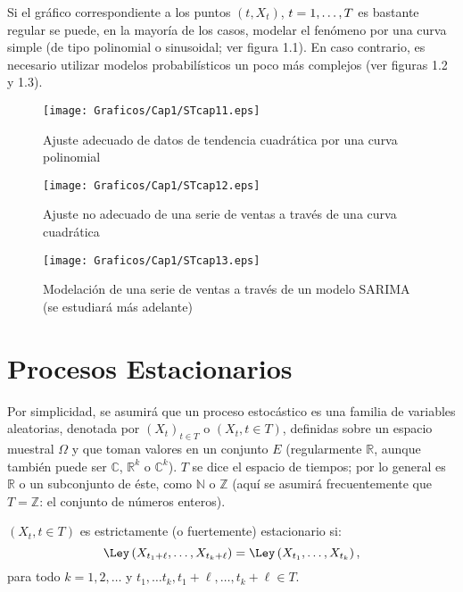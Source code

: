 Si el gr\'{a}fico correspondiente a los puntos $(t, X_{t})$, $t=1,\mathellipsis , T$ es bastante regular se puede, en la mayor\'{i}a de los casos, modelar el fen\'{o}meno por una curva simple (de tipo polinomial o sinusoidal; ver figura 1.1). En caso contrario, es necesario utilizar modelos probabil\'{i}sticos un poco m\'{a}s complejos (ver figuras 1.2 y 1.3).

\begin{figure}[H]
\centering
\texttt{[image: Graficos/Cap1/STcap11.eps]}
\caption{Ajuste adecuado de datos de tendencia cuadr\'{a}tica por una 
curva polinomial}
\end{figure}

\begin{figure}[H]
\centering
\texttt{[image: Graficos/Cap1/STcap12.eps]}
\caption{Ajuste no adecuado de una serie de ventas a trav\'{e}s de una 
curva cuadr\'{a}tica}
\end{figure}

\begin{figure}[H]
\centering
\texttt{[image: Graficos/Cap1/STcap13.eps]}
\caption{Modelaci\'{o}n de una serie de ventas a través de un modelo SARIMA (se estudiar\'{a} m\'{a}s adelante)}
\end{figure}

\section{Procesos Estacionarios}

Por simplicidad, se asumir\'{a} que un proceso estoc\'{a}stico es una familia de variables aleatorias, denotada por ${(X_{t})}_{t\in T}$ o $(X_{t}, t\in T)$, definidas sobre un espacio muestral $\Omega$ y que toman valores en un conjunto $E$ (regularmente $\mathbb{R}$, aunque tambi\'{e}n puede ser $\mathbb{C}$, $\mathbb{R}^{k}$ o $\mathbb{C}^{k}$). $T$ se dice el espacio de tiempos; por lo general es $\mathbb{R}$ o un subconjunto de \'{e}ste, como $\mathbb{N}$ o $\mathbb{Z}$ (aqu\'{i} se asumir\'{a} frecuentemente que $T=\mathbb{Z}$: el conjunto de n\'{u}meros enteros).

\begin{definicion}
 $(X_{t}, t\in T)$ es estrictamente (o fuertemente) 
estacionario si:
\[
\Ley\left(X_{t_1+\ell},\dots, X_{t_k+\ell}\right) = \Ley\left(X_{t_1},\dots, X_{t_k}\right),
\]
para todo $k=1,2,\dots$ y $t_{1},\dots t_{k}, t_{1}+\ell,\dots,t_{k}+\ell\in T$.
\end{definicion}


